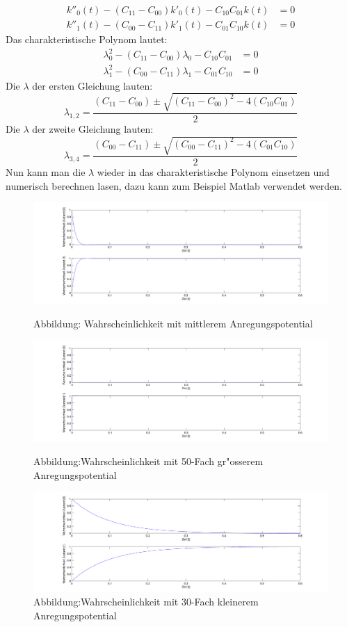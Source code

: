 \begin{refsection}
\begin{align*}
k''_{0}(t) - (C_{11}-C_{00}) k'_{0}(t) - C_{10}C_{01}k(t)&= 0
\\
k''_{1}(t) - (C_{00}-C_{11}) k'_{1}(t) - C_{01}C_{10}k(t)&= 0
\end{align*}
Das charakteristische Polynom lautet:
\begin{align*}
\lambda_{0}^{2} - (C_{11}-C_{00})\lambda_{0} - C_{10}C_{01}&= 0
\\
\lambda_{1}^{2} - (C_{00}-C_{11})\lambda_{1} - C_{01}C_{10}&= 0
\end{align*}
Die $ \lambda $ der ersten Gleichung lauten:
\[
\lambda_{1,2} = \frac{(C_{11}-C_{00})\pm \sqrt{(C_{11}-C_{00})^2-4(C_{10}C_{01})}}{2}
\]
Die $ \lambda $ der zweite Gleichung lauten:
\[
\lambda_{3,4} = \frac{(C_{00}-C_{11})\pm \sqrt{(C_{00}-C_{11})^2-4(C_{01}C_{10})}}{2}
\]
Nun kann man die $\lambda$ wieder in das charakteristische Polynom
einsetzen und numerisch berechnen lasen, dazu kann zum Beispiel Matlab
verwendet werden.

\begin{figure}
\centering
\includegraphics[width=1\textwidth]{flash/graphics/potentialmittel.pdf}
\caption{Abbildung: Wahrscheinlichkeit mit mittlerem Anregungspotential
\label{skript:potentialmittel}}
%
\centering
\includegraphics[width=1\textwidth]{flash/graphics/potentialgross.pdf}
\caption{Abbildung:Wahrscheinlichkeit mit 50-Fach gr"osserem Anregungspotential
\label{skript:potentialgross}}
%
\centering
\includegraphics[width=1\textwidth]{flash/graphics/potentialklein.pdf}
\caption{Abbildung:Wahrscheinlichkeit mit 30-Fach kleinerem Anregungspotential
\label{skript:potentialklein}}
\end{figure}


\end{refsection}
